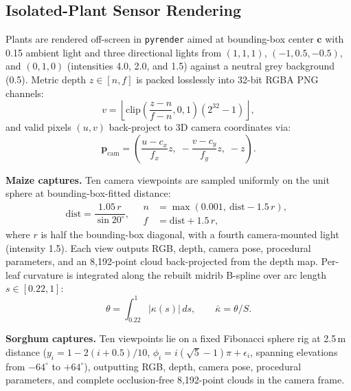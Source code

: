 \documentclass[10pt,twocolumn,letterpaper]{article}
\begin{document}
\subsection{Isolated-Plant Sensor Rendering}
Plants are rendered off-screen in \texttt{pyrender} aimed at bounding-box center $\mathbf{c}$ with 0.15 ambient light and three directional lights from $(1,1,1)$, $(-1,0.5,-0.5)$, and $(0,1,0)$ (intensities 4.0, 2.0, and 1.5) against a neutral grey background (0.5). Metric depth $z \in [n, f]$ is packed losslessly into 32-bit RGBA PNG channels:
\begin{equation}
  v = \left\lfloor \mathrm{clip}\left(\frac{z-n}{f-n}, 0, 1\right) (2^{32}-1) \right\rfloor,
\end{equation}
and valid pixels $(u,v)$ back-project to 3D camera coordinates via:
\begin{equation}
  \mathbf{p}_{\mathrm{cam}} = \left( \frac{u - c_x}{f_x} z,\; -\frac{v - c_y}{f_y} z,\; -z \right).
  \label{eq:supp-backproject}
\end{equation}

\noindent\textbf{Maize captures.} Ten camera viewpoints are sampled uniformly on the unit sphere at bounding-box-fitted distance:
\begin{equation}
  \mathrm{dist} = \frac{1.05\,r}{\sin 20^\circ},\quad
  \begin{aligned}
    n &= \max(0.001,\ \mathrm{dist} - 1.5\,r),\\
    f &= \mathrm{dist} + 1.5\,r,
  \end{aligned}
  \label{eq:supp-maizecam}
\end{equation}
where $r$ is half the bounding-box diagonal, with a fourth camera-mounted light (intensity 1.5). Each view outputs RGB, depth, camera pose, procedural parameters, and an 8{,}192-point cloud back-projected from the depth map. Per-leaf curvature is integrated along the rebuilt midrib B-spline over arc length $s \in [0.22, 1]$:
\begin{equation}
  \theta = \int_{0.22}^{1} \lvert \kappa(s) \rvert \, ds,
  \qquad \bar\kappa = \theta / S.
  \label{eq:supp-curvature}
\end{equation}

\noindent\textbf{Sorghum captures.} Ten viewpoints lie on a fixed Fibonacci sphere rig at 2.5\,m distance ($y_i = 1 - 2(i+0.5)/10$, $\phi_i = i(\sqrt{5}-1)\pi + \epsilon_i$, spanning elevations from $-64^\circ$ to $+64^\circ$), outputting RGB, depth, camera pose, procedural parameters, and complete occlusion-free 8{,}192-point clouds in the camera frame.
\end{document}
